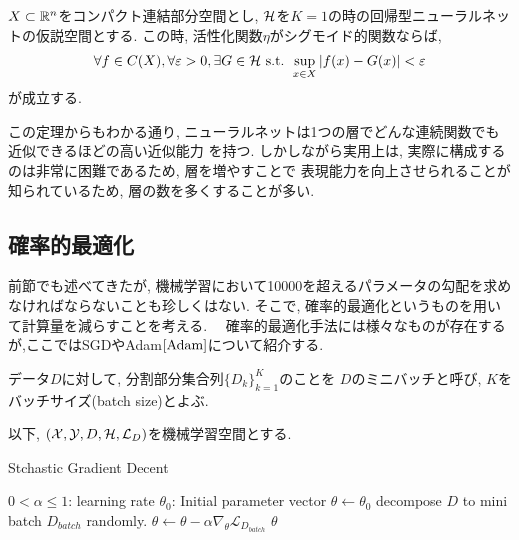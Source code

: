 \begin{Thm}[普遍性定理]
    $X\subset\mathbb{R}^n$をコンパクト連結部分空間とし, $\mathcal{H}$を$K = 1$の時の回帰型ニューラルネットの仮説空間とする. 
    この時, 活性化関数$\eta$がシグモイド的関数ならば, 
    \begin{align*}
        \forall f\in C(X), \forall\varepsilon> 0, \exists G\in\mathcal{H}\text{ s.t. } \sup_{x\in X}|f(x) - G(x)| < \varepsilon
    \end{align*}
    が成立する. 
\end{Thm}
この定理からもわかる通り, ニューラルネットは1つの層でどんな連続関数でも近似できるほどの高い近似能力
を持つ. しかしながら実用上は, 実際に構成するのは非常に困難であるため, 層を増やすことで
表現能力を向上させられることが知られているため, 層の数を多くすることが多い.
\subsection{確率的最適化}
前節でも述べてきたが, 機械学習において10000を超えるパラメータの勾配を求めなければならないことも珍しくはない.
そこで, 確率的最適化というものを用いて計算量を減らすことを考える.　
確率的最適化手法には様々なものが存在するが,ここではSGDやAdam$\cite{Adam}$について紹介する.
\begin{Defi}[ミニバッチ]
    データ$D$に対して, 分割部分集合列$\{D_{k}\}_{k = 1}^{K}$のことを
    $D$のミニバッチと呼び, $K$をバッチサイズ(batch size)とよぶ. 
\end{Defi}
以下, $(\mathcal{X}, \mathcal{Y}, D, \mathcal{H}, \mathcal{L}_{D})$を機械学習空間とする. 
\begin{algorithm}[H]
    \caption{Stchastic Gradient Decent}
    \begin{algorithmic}
        \STATE $0 < \alpha\leq 1$: learning rate
        \REQUIRE $\theta_{0}$: Initial parameter vector
        \STATE $\theta\leftarrow\theta_{0}$
        \STATE decompose $D$ to mini batch $D_{batch}$ randomly.
        \STATE $\theta\leftarrow\theta - \alpha\nabla_{\theta}\mathcal{L}_{D_{batch}}$
        \ENDFOR
        \ENDWHILE
        \RETURN $\theta$
    \end{algorithmic}
\end{algorithm}
